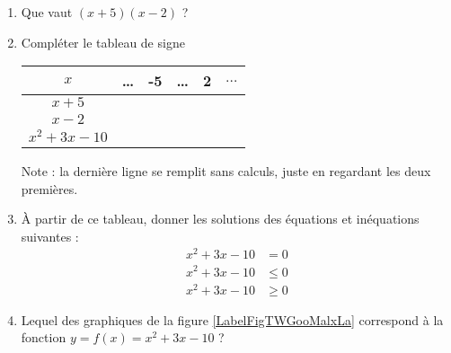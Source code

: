 
\begin{exercice}\label{exoPremiere-0030}

\begin{enumerate}
    \item
        Que vaut \( (x+5)(x-2)\) ?
    \item
        Compléter le tableau de signe
        \begin{center}
            \begin{tabular}[h]{|c||c|c|c|c|c|}
                \hline
                    \( x\)&\ldots&-5&\ldots&2&\( \ldots\)\\
                    \hline
                    \( x+5\)&&&&& \\
                    \hline
                    \( x-2\)&&&&&\\
                    \hline\hline
                    \(x^2+3x-10\)&&&&&\\
                    \hline
            \end{tabular}
        \end{center}
        Note : la dernière ligne se remplit sans calculs, juste en regardant les deux premières.
    \item
        À partir de ce tableau, donner les solutions des équations et inéquations suivantes :
        \begin{subequations}
            \begin{align}
                x^2+3x-10&=0\\
                x^2+3x-10&\leq0\\
                x^2+3x-10&\geq0
            \end{align}
        \end{subequations}
    \item
        Lequel des graphiques de la figure \ref{LabelFigTWGooMalxLa} correspond à la fonction \( y=f(x)=x^2+3x-10\) ?
\newcommand{\CaptionFigTWGooMalxLa}{Laquelle de ces trois courbes est \( x^2+3x-10\) ?}

\end{enumerate}

\end{exercice}
